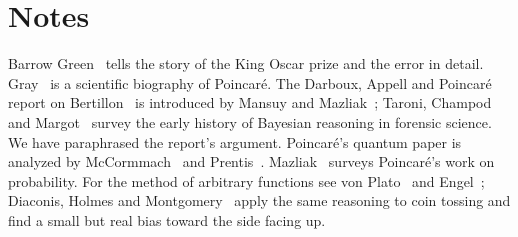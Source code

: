 

\section*{Notes}

Barrow Green~\cite{barrowgreen1997} tells the story of the King Oscar prize and the error in detail. Gray~\cite{gray2013} is a scientific biography of Poincar\'e. The Darboux, Appell and Poincar\'e report on Bertillon~\cite{darboux1904} is introduced by Mansuy and Mazliak~\cite{mansuymazliak2005}; Taroni, Champod and Margot~\cite{taroni1998} survey the early history of Bayesian reasoning in forensic science. We have paraphrased the report's argument. Poincar\'e's quantum paper is analyzed by McCormmach~\cite{mccormmach1967} and Prentis~\cite{prentis1995}. Mazliak~\cite{mazliak2012} surveys Poincar\'e's work on probability. For the method of arbitrary functions see von Plato~\cite{vonplato1994} and Engel~\cite{engel1992}; Diaconis, Holmes and Montgomery~\cite{diaconis2007coin} apply the same reasoning to coin tossing and find a small but real bias toward the side facing up.
